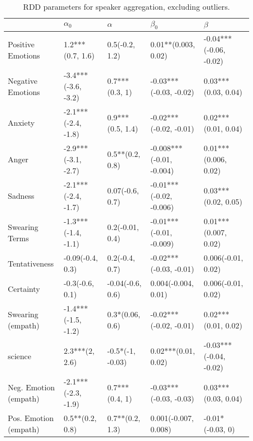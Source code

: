 \begin{table}[h]\centering
\begin{adjustbox}{width=\linewidth, center}
	\begin{tabular}{lllll}
	\toprule
	{} &           $\alpha_0$ &          $\alpha$ &                 $\beta_0$ &                 $\beta$ \\
	\midrule
	Positive Emotions     &     1.2***(0.7, 1.6) &    0.5(-0.2, 1.2) &       0.01**(0.003, 0.02) &  -0.04***(-0.06, -0.02) \\
	Negative Emotions     &  -3.4***(-3.6, -3.2) &    0.7***(0.3, 1) &    -0.03***(-0.03, -0.02) &     0.03***(0.03, 0.04) \\
	Anxiety               &  -2.1***(-2.4, -1.8) &  0.9***(0.5, 1.4) &    -0.02***(-0.02, -0.01) &     0.02***(0.01, 0.04) \\
	Anger                 &  -2.9***(-3.1, -2.7) &   0.5**(0.2, 0.8) &  -0.008***(-0.01, -0.004) &    0.01***(0.006, 0.02) \\
	Sadness               &  -2.1***(-2.4, -1.7) &   0.07(-0.6, 0.7) &   -0.01***(-0.02, -0.006) &     0.03***(0.02, 0.05) \\
	Swearing Terms        &  -1.3***(-1.4, -1.1) &   0.2(-0.01, 0.4) &   -0.01***(-0.01, -0.009) &    0.01***(0.007, 0.02) \\
	Tentativeness         &     -0.09(-0.4, 0.3) &    0.2(-0.4, 0.7) &    -0.02***(-0.03, -0.01) &      0.006(-0.01, 0.02) \\
	Certainty             &      -0.3(-0.6, 0.1) &  -0.04(-0.6, 0.6) &       0.004(-0.004, 0.01) &      0.006(-0.01, 0.02) \\
	Swearing (empath)     &  -1.4***(-1.5, -1.2) &   0.3*(0.06, 0.6) &    -0.02***(-0.02, -0.01) &     0.02***(0.01, 0.02) \\
	science               &       2.3***(2, 2.6) &  -0.5*(-1, -0.03) &       0.02***(0.01, 0.02) &  -0.03***(-0.04, -0.02) \\
	Neg. Emotion (empath) &  -2.1***(-2.3, -1.9) &    0.7***(0.4, 1) &    -0.03***(-0.03, -0.03) &     0.03***(0.03, 0.04) \\
	Pos. Emotion (empath) &      0.5**(0.2, 0.8) &   0.7**(0.2, 1.3) &      0.001(-0.007, 0.008) &        -0.01*(-0.03, 0) \\
	\bottomrule
	\end{tabular}
	
\end{adjustbox}
	\caption{RDD parameters for speaker aggregation, excluding outliers.}
	\label{fig: Speaker_2}
\end{table}

